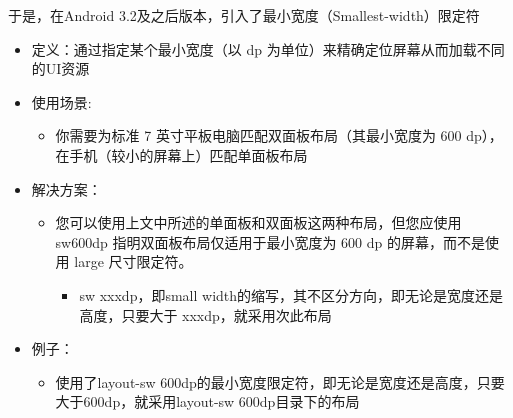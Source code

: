 \documentclass[9pt, b5paper]{article}
\begin{document}
\begin{enumerate}
\begin{enumerate}
\begin{enumerate}
于是，在Android 3.2及之后版本，引入了最小宽度（Smallest-width）限定符
\begin{itemize}
\item 定义：通过指定某个最小宽度（以 dp 为单位）来精确定位屏幕从而加载不同的UI资源
\item 使用场景:
\begin{itemize}
\item 你需要为标准 7 英寸平板电脑匹配双面板布局（其最小宽度为 600 dp），在手机（较小的屏幕上）匹配单面板布局
\end{itemize}
\item 解决方案：
\begin{itemize}
\item 您可以使用上文中所述的单面板和双面板这两种布局，但您应使用 sw600dp 指明双面板布局仅适用于最小宽度为 600 dp 的屏幕，而不是使用 large 尺寸限定符。
\begin{itemize}
\item sw xxxdp，即small width的缩写，其不区分方向，即无论是宽度还是高度，只要大于 xxxdp，就采用次此布局
\end{itemize}
\end{itemize}
\item 例子：
\begin{itemize}
\item 使用了layout-sw 600dp的最小宽度限定符，即无论是宽度还是高度，只要大于600dp，就采用layout-sw 600dp目录下的布局
\end{itemize}
\end{itemize}


\end{enumerate}
\end{enumerate}
\end{enumerate}
\end{document}
